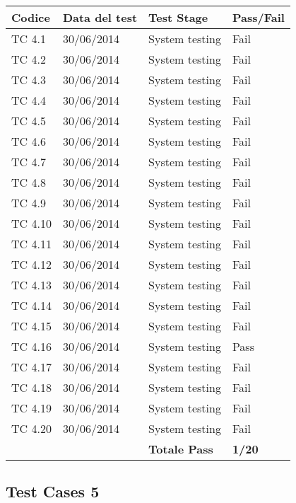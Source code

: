 \begin{tabular}{|p{3cm}|p{3cm}|p{3cm}|p{3cm}|}
	\hline
	\rowcolor{Gray}
	\textbf{Codice} & \textbf{Data del test} & \textbf{Test Stage} & \textbf{Pass/Fail}\tabularnewline
	\hline
	TC 4.1			& 30/06/2014 			& System testing		& Fail \tabularnewline
	\hline
	TC 4.2			& 30/06/2014 			& System testing		& Fail \tabularnewline
	\hline
	TC 4.3			& 30/06/2014 			& System testing		& Fail \tabularnewline
	\hline
	TC 4.4			& 30/06/2014 			& System testing		& Fail \tabularnewline
	\hline
	TC 4.5			& 30/06/2014 			& System testing		& Fail \tabularnewline
	\hline
	TC 4.6			& 30/06/2014 			& System testing		& Fail \tabularnewline
	\hline
	TC 4.7			& 30/06/2014 			& System testing		& Fail \tabularnewline
	\hline
	TC 4.8			& 30/06/2014 			& System testing		& Fail \tabularnewline
	\hline
	TC 4.9			& 30/06/2014 			& System testing		& Fail \tabularnewline
	\hline
	TC 4.10			& 30/06/2014 			& System testing		& Fail \tabularnewline
	\hline
	TC 4.11			& 30/06/2014 			& System testing		& Fail \tabularnewline
	\hline
	TC 4.12			& 30/06/2014 			& System testing		& Fail \tabularnewline
	\hline
	TC 4.13			& 30/06/2014 			& System testing		& Fail \tabularnewline
	\hline
	TC 4.14			& 30/06/2014 			& System testing		& Fail \tabularnewline
	\hline
	TC 4.15			& 30/06/2014 			& System testing		& Fail \tabularnewline
	\hline
	TC 4.16			& 30/06/2014 			& System testing		& Pass \tabularnewline
	\hline
	TC 4.17			& 30/06/2014 			& System testing		& Fail \tabularnewline
	\hline
	TC 4.18			& 30/06/2014 			& System testing		& Fail \tabularnewline
	\hline
	TC 4.19			& 30/06/2014 			& System testing		& Fail \tabularnewline
	\hline
	TC 4.20			& 30/06/2014 			& System testing		& Fail \tabularnewline
	\hline
					& 						& \textbf{Totale Pass}	& \textbf{1/20} \tabularnewline
	\hline
\end{tabular}

\subsection{Test Cases 5}


